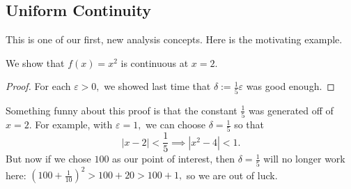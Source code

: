 \subsection{Uniform Continuity}
This is one of our first, new analysis concepts. Here is the motivating example.
\begin{exercise}
	We show that $f(x)=x^2$ is continuous at $x=2.$
\end{exercise}
\begin{proof}
	For each $\varepsilon>0,$ we showed last time that $\delta:=\frac15\varepsilon$ was good enough.
\end{proof}
Something funny about this proof is that the constant $\frac15$ was generated off of $x=2.$ For example, with $\varepsilon=1,$ we can choose $\delta=\frac15$ so that
\[|x-2|<\frac15\implies\left|x^2-4\right|<1.\]
But now if we chose $100$ as our point of interest, then $\delta=\frac15$ will no longer work here: $\left(100+\frac1{10}\right)^2>100+20>100+1,$ so we are out of luck.

